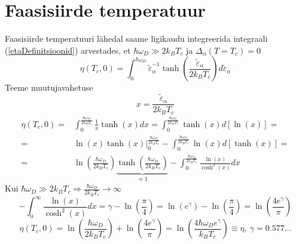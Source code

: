 \documentclass[class=article, crop=false]{standalone}
\begin{document}
\section{Faasisiirde temperatuur}
Faasisiirde temperatuuri lähedal saame ligikaudu integreerida integraali (\ref{etaDefinitsioonid}) arvestades, et $ \hbar \omega_{D} \gg 2 k_{B} T_{c} $ ja $ \Delta_{ \alpha} (T = T_{c}) = 0 $
\begin{equation}\label{key}
	\eta (T_{c}, 0) = \int_{0}^{ \hbar \omega_{D}} \tilde{ \varepsilon}_{ \alpha}^{-1} \tanh \left( \frac{ \tilde{ \varepsilon}_{ \alpha}}{2 k_{B} T_{c}} \right) d \tilde{ \varepsilon}_{ \alpha}
\end{equation}
Teeme muutujavahetuse
\begin{equation}\label{key}
	x = \frac{ \tilde{ \varepsilon}_{ \alpha}}{2 k_{B} T_{c}}
\end{equation}
\begin{equation}\label{key}
	\begin{split}
		\eta (T_{c}, 0) = & \int_{0}^{ \frac{ \hbar \omega_{D}}{2 k_{B} T_{c}}} \frac{1}{x} \tanh (x) dx = \int_{0}^{ \frac{ \hbar \omega_{D}}{2 k_{B} T_{c}}} \tanh (x) d [\ln (x)] = \\
		= & \left. \ln (x) \tanh (x) \right|_{0}^{ \frac{ \hbar \omega_{D}}{2 k_{B} T_{c}}} - \int_{0}^{ \frac{ \hbar \omega_{D}}{2 k_{B} T_{c}}} \ln (x) d [\tanh (x)] = \\
		= & \ln \left( \frac{ \hbar \omega_{D}}{2 k_{B} T_{c}} \right) \underbrace{ \tanh \left( \frac{ \hbar \omega_{D}}{2 k_{B} T_{c}} \right)}_{ \approx 1} - \int_{0}^{ \frac{ \hbar \omega_{D}}{2 k_{B} T_{c}}} \frac{ \ln (x)}{ \cosh^{2} (x)} dx
	\end{split}
\end{equation}
Kui $ \hbar \omega_{D} \gg 2 k_{B} T_{c} \Rightarrow \frac{ \hbar \omega_{D}}{2 k_{B} T_{c}} \rightarrow \infty $
\begin{equation}\label{key}
	- \int_{0}^{ \infty} \frac{ \ln (x)}{ \cosh^{2} (x)} dx = \gamma - \ln \left( \frac{ \pi}{4} \right) = \ln \left( e^{ \gamma} \right) - \ln \left( \frac{ \pi}{4} \right) = \ln \left( \frac{4 e^{ \gamma}}{ \pi} \right) 
\end{equation}
\begin{equation}\label{etaIntegraalTc}
	\eta (T_{c}, 0) = \ln \left( \frac{ \hbar \omega_{D}}{2 k_{B} T_{c}} \right) + \ln \left( \frac{4 e^{ \gamma}}{ \pi} \right) = \ln \left( \frac{ 4 \hbar \omega_{D} e^{ \gamma}}{k_{B} T_{c}} \right) \equiv \eta,\ \gamma = 0.577 \dots
\end{equation}
\end{document}
